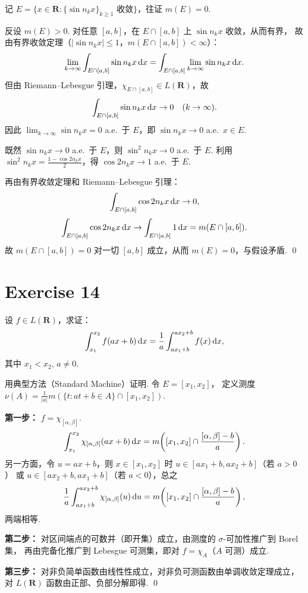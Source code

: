 \documentclass{article}
\begin{document}
\begin{solution}
  记 $E = \{x \in \mathbf{R} : \{\sin n_k x\}_{k \ge 1} \text{ 收敛}\}$，往证 $m(E) = 0$.

  反设 $m(E) > 0$. 对任意 $[a, b]$，在 $E \cap [a,b]$ 上 $\sin n_k x$ 收敛，从而有界，
  故由有界收敛定理（$|\sin n_k x| \le 1$，$m(E \cap [a,b]) < \infty$）：
  \[
    \lim_{k\to\infty} \int_{E \cap [a,b]} \sin n_k x\,\mathrm{d} x
    = \int_{E \cap [a,b]} \lim_{k\to\infty} \sin n_k x\,\mathrm{d} x.
  \]
  但由 Riemann--Lebesgue 引理，$\chi_{E \cap [a,b]} \in L(\mathbf{R})$，故
  \[
    \int_{E \cap [a,b]} \sin n_k x\,\mathrm{d} x \to 0 \quad (k \to \infty).
  \]
  因此 $\lim_{k\to\infty} \sin n_k x = 0$ a.e.\ 于 $E$，即 $\sin n_k x \to 0$ a.e.\ $x \in E$.

  既然 $\sin n_k x \to 0$ a.e.\ 于 $E$，则 $\sin^2 n_k x \to 0$ a.e.\ 于 $E$.
  利用 $\sin^2 n_k x = \frac{1 - \cos 2n_k x}{2}$，得 $\cos 2n_k x \to 1$ a.e.\ 于 $E$.

  再由有界收敛定理和 Riemann--Lebesgue 引理：
  \[
    \int_{E \cap [a,b]} \cos 2n_k x\,\mathrm{d} x \to 0,
  \]
  \[
    \int_{E \cap [a,b]} \cos 2n_k x\,\mathrm{d} x \to \int_{E \cap [a,b]} 1\,\mathrm{d} x = m(E \cap [a,b]).
  \]
  故 $m(E \cap [a,b]) = 0$ 对一切 $[a,b]$ 成立，从而 $m(E) = 0$，与假设矛盾. \qed
\end{solution}

\section{Exercise 14}

设 $f \in L(\mathbf{R})$，求证：
\[
  \int_{x_1}^{x_2} f(ax+b)\,\mathrm{d} x = \frac{1}{a} \int_{ax_1+b}^{ax_2+b} f(x)\,\mathrm{d} x,
\]
其中 $x_1 < x_2$, $a \ne 0$.

\begin{solution}
  用典型方法（Standard Machine）证明. 令 $E = [x_1, x_2]$，
  定义测度 $\nu(A) = \frac{1}{|a|} m(\{t : at + b \in A\} \cap [x_1, x_2])$.

  \textbf{第一步：} $f = \chi_{[\alpha,\beta]}$.
  \[
    \int_{x_1}^{x_2} \chi_{[\alpha,\beta]}(ax+b)\,\mathrm{d} x
    = m\!\left([x_1,x_2] \cap \frac{[\alpha,\beta] - b}{a}\right).
  \]
  另一方面，令 $u = ax + b$，则 $x \in [x_1, x_2]$ 时 $u \in [ax_1+b, ax_2+b]$（若 $a > 0$）
  或 $u \in [ax_2+b, ax_1+b]$（若 $a < 0$），总之
  \[
    \frac{1}{a}\int_{ax_1+b}^{ax_2+b} \chi_{[\alpha,\beta]}(u)\,\mathrm{d} u
    = m\!\left([x_1,x_2] \cap \frac{[\alpha,\beta] - b}{a}\right),
  \]
  两端相等.

  \textbf{第二步：} 对区间端点的可数并（即开集）成立，由测度的 $\sigma$-可加性推广到 Borel 集，
  再由完备化推广到 Lebesgue 可测集，即对 $f = \chi_A$（$A$ 可测）成立.

  \textbf{第三步：} 对非负简单函数由线性性成立，对非负可测函数由单调收敛定理成立，
  对 $L(\mathbf{R})$ 函数由正部、负部分解即得. \qed
\end{solution}
\end{document}
